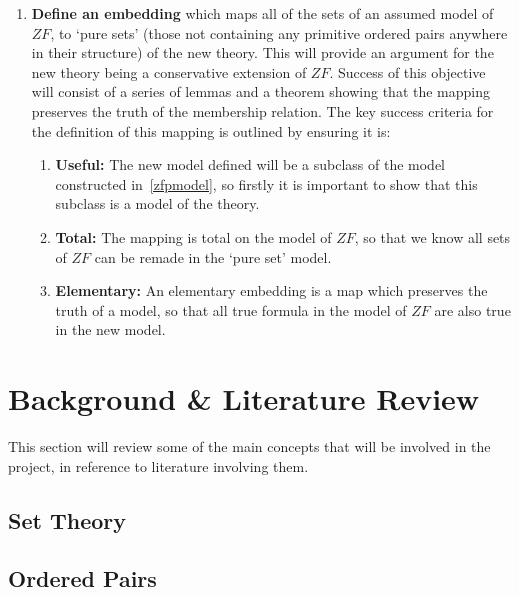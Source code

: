 \documentclass[11pt]{report}
\theoremstyle{definition}
\theoremstyle{theorem}
\theoremstyle{lemma}
\begin{document}
\begin{enumerate}
  \item \textbf{Define an embedding} which maps all of the sets of an assumed model of $\mathit{ZF}$, to `pure sets' (those not containing any primitive ordered pairs anywhere in their structure) of the new theory. 
  This will provide an argument for the new theory being a conservative extension of $\mathit{ZF}$.
  Success of this objective will consist of a series of lemmas and a theorem showing that the mapping preserves the truth of the membership relation. 
  The key success criteria for the definition of this mapping is outlined by ensuring it is:
  \begin{enumerate}
    \item \textbf{Useful:} The new model defined will be a subclass of the model constructed in~\ref{zfpmodel}, so firstly it is important to show that this subclass is a model of the theory.
    \item \textbf{Total:} The mapping is total on the model of $\mathit{ZF}$, so that we know all sets of $\mathit{ZF}$ can be remade in the `pure set' model. 
    \item \textbf{Elementary:} An elementary embedding is a map which preserves the truth of a model, so that all true formula in the model of $\mathit{ZF}$ are also true in the new model.   
  \end{enumerate} 
\end{enumerate}


\chapter{Background \& Literature Review}
This section will review some of the main concepts that will be involved in the project, in reference to literature involving them.

\section{Set Theory}


\section{Ordered Pairs}
\end{document}
